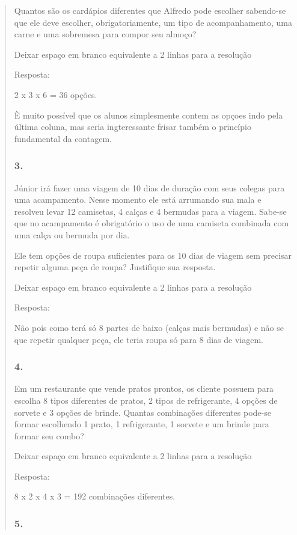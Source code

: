 \begin{enumerate}
\begin{escolha}
\begin{enumerate}
\begin{itemize}
\begin{itemize}
\begin{escolha}
\begin{quote}
\begin{escolha}
{Quantos são os cardápios diferentes que Alfredo pode escolher sabendo-se
que ele deve escolher, obrigatoriamente, um tipo de acompanhamento, uma
carne e uma sobremesa para compor seu almoço?

Deixar espaço em branco equivalente a 2 linhas para a resolução

Resposta:

2 x 3 x 6 = 36 opções.

È muito possível que os alunos simplesmente contem as opçoes indo pela
última coluna, mas seria ingteressante frisar também o princípio
fundamental da contagem.

\subsubsection{3.}\label{section-132}

Júnior irá fazer uma viagem de 10 dias de duração com seus colegas para
uma acampamento. Nesse momento ele está arrumando sua mala e resolveu
levar 12 camisetas, 4 calças e 4 bermudas para a viagem. Sabe-se que no
acampamento é obrigatório o uso de uma camiseta combinada com uma calça
ou bermuda por dia.

Ele tem opções de roupa suficientes para os 10 dias de viagem sem
precisar repetir alguma peça de roupa? Justifique sua resposta.

Deixar espaço em branco equivalente a 2 linhas para a resolução

Resposta:

Não pois como terá só 8 partes de baixo (calças mais bermudas) e não se
que repetir qualquer peça, ele teria roupa só para 8 dias de viagem.

\subsubsection{4.}\label{section-133}

Em um restaurante que vende pratos prontos, os cliente possuem para
escolha 8 tipos diferentes de pratos, 2 tipos de refrigerante, 4 opções
de sorvete e 3 opções de brinde. Quantas combinações diferentes pode-se
formar escolhendo 1 prato, 1 refrigerante, 1 sorvete e um brinde para
formar seu combo?

Deixar espaço em branco equivalente a 2 linhas para a resolução

Resposta:

8 x 2 x 4 x 3 = 192 combinações diferentes.

\subsubsection{5.}\label{section-134}

}
\end{escolha}
\end{quote}
\end{escolha}
\end{itemize}
\end{itemize}
\end{enumerate}
\end{escolha}
\end{enumerate}
